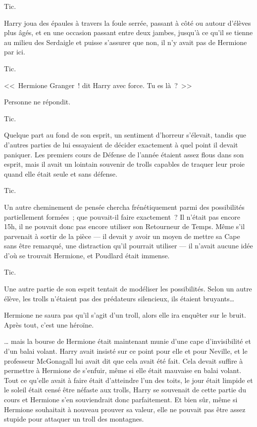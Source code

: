 Tic.

Harry joua des épaules à travers la foule serrée, passant à côté ou autour d'élèves plus âgés, et en une occasion passant entre deux jambes, jusqu'à ce qu'il se tienne au milieu des Serdaigle et puisse s'assurer que non, il n'y avait pas de Hermione par ici.

Tic.

<<~Hermione Granger~! dit Harry avec force. Tu es là~?~>>

Personne ne répondit.

Tic.

Quelque part au fond de son esprit, un sentiment d'horreur s'élevait, tandis que d'autres parties de lui essayaient de décider exactement à quel point il devait paniquer. Les premiers cours de Défense de l'année étaient assez flous dans son esprit, mais il avait un lointain souvenir de trolls capables de traquer leur proie quand elle était seule et sans défense.

Tic.

Un autre cheminement de pensée chercha frénétiquement parmi des possibilités partiellement formées~; que pouvait-il faire exactement~? Il n'était pas encore 15h, il ne pouvait donc pas encore utiliser son Retourneur de Temps. Même s'il parvenait à sortir de la pièce — il devait y avoir un moyen de mettre sa Cape sans être remarqué, une distraction qu'il pourrait utiliser — il n'avait aucune idée d'où se trouvait Hermione, et Poudlard était immense.

Tic.

Une autre partie de son esprit tentait de modéliser les possibilités. Selon un autre élève, les trolls n'étaient pas des prédateurs silencieux, ils étaient bruyants…

Hermione ne saura pas qu'il s'agit d'un troll, alors elle ira enquêter sur le bruit. Après tout, c'est une héroïne.

… mais la bourse de Hermione était maintenant munie d'une cape d'invisibilité et d'un balai volant. Harry avait insisté sur ce point pour elle et pour Neville, et le professeur McGonagall lui avait dit que cela avait été fait. Cela devait suffire à permettre à Hermione de s'enfuir, même si elle était mauvaise en balai volant. Tout ce qu'elle avait à faire était d'atteindre l'un des toits, le jour était limpide et le soleil était censé être néfaste aux trolls, Harry se souvenait de cette partie du cours et Hermione s'en souviendrait donc parfaitement. Et bien sûr, même si Hermione souhaitait à nouveau prouver sa valeur, elle ne pouvait pas être assez stupide pour attaquer un troll des montagnes.

